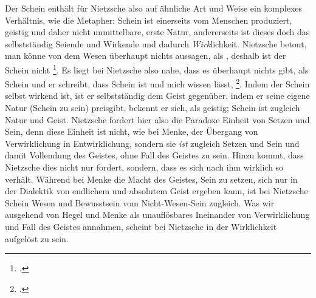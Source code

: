 \documentclass[12pt, a4paper, openany]{report}
\begin{document}
Der Schein enthält für Nietzsche also auf ähnliche Art und Weise ein komplexes Verhältnis, wie die Metapher: 
Schein ist einerseits vom Menschen produziert, geistig und daher nicht unmittelbare, erste Natur, andererseits ist dieses doch das selbstständig Seiende und Wirkende und dadurch \emph{Wirk}lichkeit.
Nietzsche betont, man könne von dem Wesen überhaupt nichts aussagen, als , deshalb ist der Schein nicht \footcite[][417]{nietzsche_geburt_1999}.
Es liegt bei Nietzsche also nahe, dass es überhaupt nichts gibt, als Schein und er schreibt, dass Schein  ist und mich wissen lässt, \footcite[][417]{nietzsche_morgenrote_1999}.
Indem der Schein selbst wirkend ist, ist er selbstständig dem Geist gegenüber, indem er seine eigene Natur (Schein zu sein) preisgibt, bekennt er sich, als geistig;
Schein ist zugleich Natur und Geist.
Nietzsche fordert hier also die Paradoxe Einheit von Setzen und Sein, denn diese Einheit ist nicht, wie bei Menke, der Übergang von Verwirklichung in Entwirklichung, sondern sie \emph{ist} zugleich Setzen und Sein und damit Vollendung des Geistes, ohne Fall des Geistes zu sein.
Hinzu kommt, dass Nietzsche dies nicht nur fordert, sondern, dass es sich nach ihm wirklich so verhält.
Während bei Menke die Macht des Geistes, Sein zu setzen, sich nur in der Dialektik von endlichem und absolutem Geist ergeben kann,
ist bei Nietzsche Schein Wesen und Bewusstsein vom Nicht-Wesen-Sein zugleich.
Was wir ausgehend von Hegel und Menke als unauflösbares Ineinander von Verwirklichung und Fall des Geistes annahmen, scheint bei Nietzsche in der Wirklichkeit aufgelöst zu sein. \\
\end{document}
